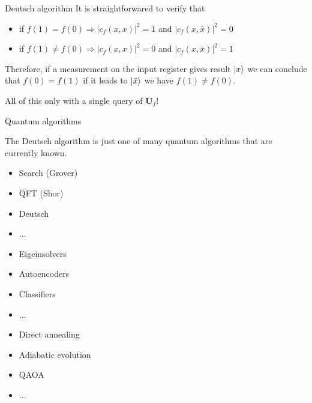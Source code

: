 \documentclass[11p,aspectratio=169]{beamer}
\begin{document}
\begin{frame}{Deutsch algorithm}
    It is straightforwared to verify that
    \begin{itemize}
        \item if $f(1) = f(0) \Rightarrow |c_f(x,x)|^2 = 1$ and $|c_f(x,\bar{x})|^2 = 0$
        \item if $f(1) \neq f(0) \Rightarrow |c_f(x,x)|^2 = 0$ and $|c_f(x,\bar{x})|^2 = 1$
    \end{itemize}
    Therefore, if a measurement on the input register gives result $\ket{x}$ we can conclude that $f(0) = f(1)$
    if it leads to $\ket{\bar{x}}$ we have $f(1) \neq f(0)$.

    All of this only with a single query of $\textbf{U}_f$!

\end{frame}

\begin{frame}{Quantum algorithms}

    The Deutsch algorithm is just one of many quantum algorithms that are currently known.

\begin{multicols*}{3}
    \begin{tcolorbox}[title=Gate Circuits]
        \begin{itemize}
            \item Search (Grover)
            \item QFT (Shor)
            \item Deutsch
            \item $\dots$   
            \end{itemize}
     \end{tcolorbox}

\begin{tcolorbox}[title=Variational]
    \begin{itemize}
        \item Eigeinsolvers
        \item Autoencoders
        \item Classifiers
        \item $\dots$   
        \end{itemize}
 \end{tcolorbox}

 \begin{tcolorbox}[title=Annealing]
    \begin{itemize}
        \item Direct annealing
        \item Adiabatic evolution
        \item QAOA
        \item $\dots$   
        \end{itemize}
 \end{tcolorbox}

\end{multicols*}
    
\end{frame}
\end{document}
